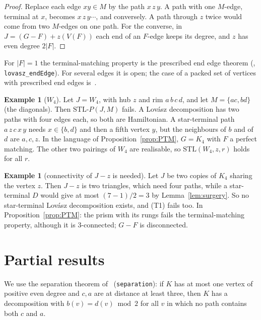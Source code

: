 \documentclass[11pt]{amsart}
\theoremstyle{definition}
\newtheorem{example}[theorem]{Example}
\newcommand{\STL}{\mathrm{STL}}
\begin{document}
\begin{proof}
Replace each edge $xy\in M$ by the path $x\,z\,y$. A path with one $M$-edge, terminal at $x$,
becomes $x\,z\,y\cdots$, and conversely. A path through $z$ twice would come from two $M$-edges on
one path. For the converse, in $J=(G-F)+z(V(F))$ each end of an $F$-edge keeps its degree, and $z$
has even degree $2|F|$.
\end{proof}

For $|F|=1$ the terminal-matching property is the prescribed end edge theorem
(\cite[Thm.~14]{MS}, \texttt{lovasz\_endEdge}). For several edges it is open; the
case of a packed set of vertices with prescribed end edges is~\cite[Question~25]{MS}.

\begin{example}[$W_4$]\label{ex:W4}
Let $J=W_4$, with hub $z$ and rim $a\,b\,c\,d$, and let $M=\{ac,bd\}$ (the diagonals). Then
$\STL\text{-}P(J,M)$ fails. A Lov\'asz decomposition has two paths with four edges each, so both
are Hamiltonian. A star-terminal path $a\,z\,c\,x\,y$ needs $x\in\{b,d\}$ and then a fifth vertex
$y$, but the neighbours of $b$ and of $d$ are $a,c,z$. In the language of
Proposition~\ref{prop:PTM}, $G=K_4$ with $F$ a perfect matching. The other two pairings of $W_4$ are
realisable, so $\STL(W_4,z,r)$ holds for all $r$.
\end{example}

\begin{example}[connectivity of $J-z$ is needed]\label{ex:bowtie}
Let $J$ be two copies of $K_4$ sharing the vertex $z$. Then $J-z$ is two triangles, which need four
paths, while a star-terminal $D$ would give at most $(7-1)/2=3$ by Lemma~\ref{lem:surgery}. So no
star-terminal Lov\'asz decomposition exists, and (T1) fails too. In
Proposition~\ref{prop:PTM}: the prism with its rungs fails the terminal-matching property, although
it is $3$-connected; $G-F$ is disconnected.
\end{example}

\section{Partial results}\label{sec:partial}

We use the separation theorem of~\cite{RD} (\texttt{separation}): if $K$ has at most one vertex of
positive even degree and $c,a$ are at distance at least three, then $K$ has a decomposition with
$b(v)=d(v)\bmod2$ for all $v$ in which no path contains both $c$ and $a$.
\end{document}
